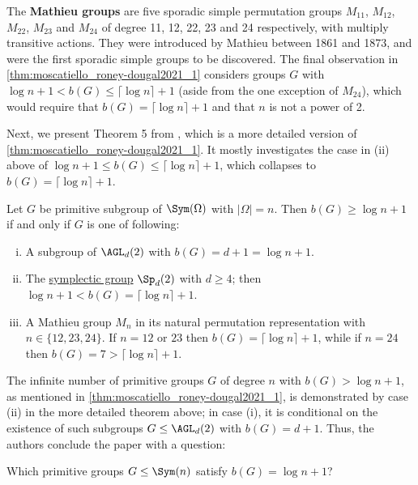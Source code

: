 The \textbf{Mathieu groups} are five sporadic simple permutation groups $M_{11}$, $M_{12}$, $M_{22}$, $M_{23}$ and $M_{24}$ of degree 11, 12, 22, 23 and 24 respectively, with multiply transitive actions. They were introduced by Mathieu between 1861 and 1873, and were the first sporadic simple groups to be discovered. The final observation in \autoref{thm:moscatiello_roney-dougal2021_1} considers groups $G$ with $\log n + 1 < b(G) \leq \lceil\log n\rceil + 1$ (aside from the one exception of $M_{24}$), which would require that $b(G) = \lceil\log n\rceil + 1$ and that $n$ is not a power of 2.

Next, we present Theorem 5 from \cite{moscatiello_roney-dougal2021}, which is a more detailed version of \autoref{thm:moscatiello_roney-dougal2021_1}. It mostly investigates the case in (ii) above of $\log n + 1 \leq b(G) \leq \lceil\log n\rceil + 1$, which collapses to $b(G) = \lceil\log n\rceil + 1$.

\begin{theorem}\label{thm:moscatiello_roney-dougal2021_5}
    Let $G$ be primitive subgroup of $\Sym(\Omega)$ with $|\Omega| = n$. Then $b(G) \geq \log n + 1$ if and only if $G$ is one of following:
    \begin{enumerate}[(i)]
        \item A subgroup of $\AGL_d(2)$ with $b(G) = d + 1 = \log n + 1$.
        \item The \hyperref[def:symplectic_group]{symplectic group} $\Sp_d(2)$ with $d \geq 4$; then $\log n + 1 < b(G) = \lceil\log n\rceil + 1$. %
        \item A Mathieu group $M_n$ in its natural permutation representation with $n \in \{12,23,24\}$. If $n = 12$ or $23$ then $b(G) = \lceil\log n\rceil + 1$, while if $n = 24$ then $b(G) = 7 > \lceil\log n\rceil + 1$.
    \end{enumerate}
\end{theorem}

The infinite number of primitive groups $G$ of degree $n$ with $b(G) > \log n + 1$, as mentioned in \autoref{thm:moscatiello_roney-dougal2021_1}, is demonstrated by case (ii) in the more detailed theorem above; in case (i), it is conditional on the existence of such subgroups $G \leq \AGL_d(2)$ with $b(G) = d + 1$. Thus, the authors conclude the paper \cite{moscatiello_roney-dougal2021} with a question:

\begin{question}\label{qn:moscatiello_roney-dougal2021}
    Which primitive groups $G \leq \Sym(n)$ satisfy $b(G) = \log n + 1$?
\end{question}

